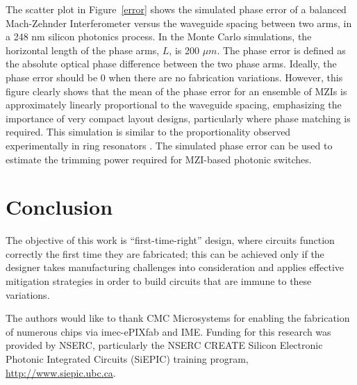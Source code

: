 \documentclass[journal]{spie}
\begin{document}
The scatter plot in Figure~\ref{error} shows the simulated phase error of a balanced Mach-Zehnder Interferometer versus the waveguide spacing between two arms, in a 248 nm silicon photonics process. In the Monte Carlo simulations, the horizontal length of the phase arms, $L$,  is 200 $\mu m$. The phase error is defined as the absolute optical phase difference between the two phase arms. Ideally, the phase error should be 0 when there are no fabrication variations. However, this figure clearly shows that the mean of the phase error for an ensemble of MZIs is approximately linearly proportional to the waveguide spacing, emphasizing the importance of very compact layout designs, particularly where phase matching is required.  This simulation is similar to the proportionality  observed experimentally in ring resonators \cite{lukas14:OFC}.  The simulated phase error can be used to estimate the trimming power required for MZI-based photonic switches. 



\section{Conclusion}\label{sec6}

%
%


The  objective of this work is ``first-time-right'' design, where circuits function correctly the first time they are fabricated; this can be achieved only if the designer takes manufacturing challenges into consideration and applies effective mitigation strategies in order to build circuits that are immune to these variations.



\acknowledgments

The authors would like to thank CMC Microsystems for enabling the fabrication of numerous chips via imec-ePIXfab and IME.  Funding for this research was provided by NSERC, particularly the NSERC CREATE Silicon Electronic Photonic Integrated Circuits (SiEPIC) training program, \url{http://www.siepic.ubc.ca}.



\end{document}
